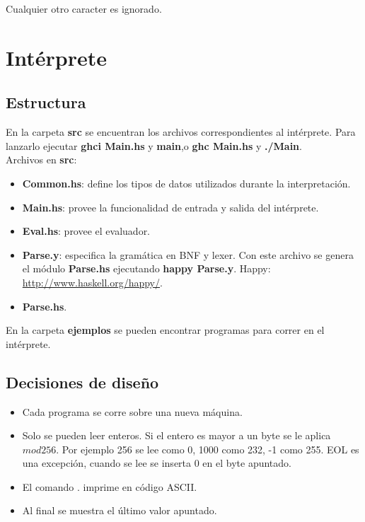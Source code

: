 \documentclass[a4paper, 12pt]{article}
\begin{document}
Cualquier otro caracter es ignorado.
\section*{Intérprete}

\subsection*{Estructura}

En la carpeta \textbf{src} se encuentran los archivos correspondientes al intérprete. Para lanzarlo
ejecutar \textbf{ghci Main.hs} y \textbf{main},o \textbf{ghc Main.hs} y \textbf{./Main}. \\
Archivos en \textbf{src}:
\begin{itemize}
	\item \textbf{Common.hs}: define los tipos de datos utilizados durante la interpretación.
	\item \textbf{Main.hs}: provee la funcionalidad de entrada y salida del intérprete.
	\item \textbf{Eval.hs}: provee el evaluador.
	\item \textbf{Parse.y}: especifica la gramática en BNF y lexer. Con este archivo se genera el módulo \textbf{Parse.hs} ejecutando \textbf{happy Parse.y}.
	Happy: \url{http://www.haskell.org/happy/}.
	\item \textbf{Parse.hs}.
\end{itemize}

En la carpeta \textbf{ejemplos} se pueden encontrar programas para correr en el intérprete. \\


\subsection*{Decisiones de diseño}

\begin{itemize}
	\item Cada programa se corre sobre una nueva máquina.
	\item Solo se pueden leer enteros. Si el entero es mayor a un byte se le aplica $mod 256$. Por ejemplo 256
	se lee como 0, 1000 como 232, -1 como 255. EOL es una excepción, cuando se lee se inserta 0 en el byte apuntado.
	\item El comando . imprime en código ASCII.
	\item Al final se muestra el último valor apuntado.
\end{itemize}
\end{document}
